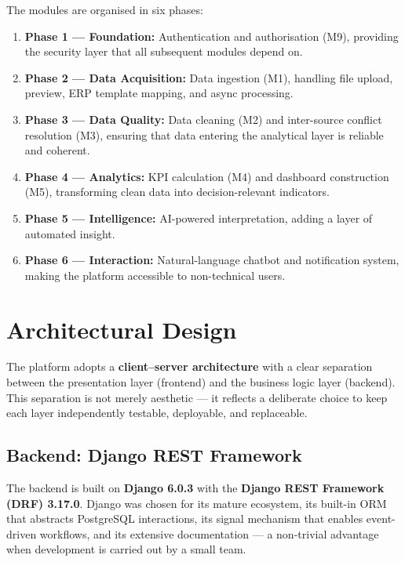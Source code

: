 \vspace{0.4cm}
\noindent
The modules are organised in six phases:

\begin{enumerate}
  \item \textbf{Phase 1 — Foundation:} Authentication and authorisation (M9),
        providing the security layer that all subsequent modules depend on.
  \item \textbf{Phase 2 — Data Acquisition:} Data ingestion (M1),
        handling file upload, preview, ERP template mapping,
        and async processing.
  \item \textbf{Phase 3 — Data Quality:} Data cleaning (M2)
        and inter-source conflict resolution (M3),
        ensuring that data entering the analytical layer
        is reliable and coherent.
  \item \textbf{Phase 4 — Analytics:} KPI calculation (M4)
        and dashboard construction (M5),
        transforming clean data into decision-relevant indicators.
  \item \textbf{Phase 5 — Intelligence:} AI-powered interpretation,
        adding a layer of automated insight.
  \item \textbf{Phase 6 — Interaction:} Natural-language chatbot
        and notification system, making the platform
        accessible to non-technical users.
\end{enumerate}


\section{Architectural Design}

\noindent
The platform adopts a \textbf{client–server architecture}
with a clear separation between the presentation layer
(frontend) and the business logic layer (backend).
This separation is not merely aesthetic — it reflects
a deliberate choice to keep each layer independently
testable, deployable, and replaceable.

\subsection{Backend: Django REST Framework}

\noindent
The backend is built on \textbf{Django 6.0.3}
with the \textbf{Django REST Framework (DRF) 3.17.0}.
Django was chosen for its mature ecosystem,
its built-in ORM that abstracts PostgreSQL interactions,
its signal mechanism that enables event-driven workflows,
and its extensive documentation — a non-trivial advantage
when development is carried out by a small team.

